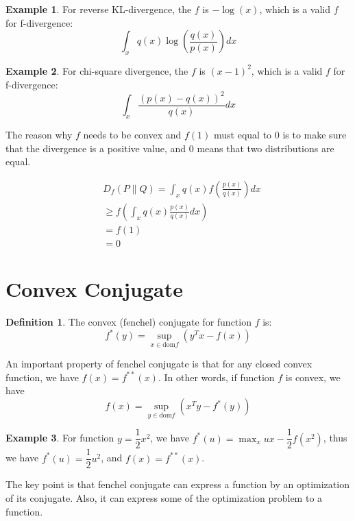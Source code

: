 \documentclass[a4paper]{article}
\theoremstyle{definition}
\newtheorem{defn}{Definition}[section]
\newtheorem{exmp}{Example}[section]
\begin{document}
\begin{exmp}
For reverse KL-divergence, the $f$ is $-\log(x)$, which is a valid $f$ for f-divergence: $$
\int_{x} q(x) \log \left(\frac{q(x)}{p(x)}\right) d x
$$
\end{exmp}

\begin{exmp}
For chi-square divergence, the $f$ is $(x-1)^2$, which is a valid $f$ for f-divergence: $$
\int_{x} \frac{(p(x)-q(x))^{2}}{q(x)} d x
$$
\end{exmp}

The reason why $f$ needs to be convex and $f(1)$ must equal to 0 is to make sure that the divergence is a positive value, and $0$ means that two distributions are equal.

\begin{align}
&D_{f}(P \| Q)=\int_{x} q(x) f\left(\frac{p(x)}{q(x)}\right) d x\\
&\geq f\left(\int_{x} q(x) \frac{p(x)}{q(x)} d x\right)\\
&=f(1)\\
&=0
\end{align}

\section{Convex Conjugate}
\begin{defn}
The convex (fenchel) conjugate for function $f$ is:
\begin{equation}
f^{*}(y)=\sup _{x \in \mathrm{dom} f}\left(y^{T} x-f(x)\right)
\end{equation}
\end{defn}

An important property of fenchel conjugate is that for any closed convex function, we have $f(x) = f^{**}(x)$. In other words, if function $f$ is convex, we have $$f(x) =\sup _{y \in \mathrm{dom} f}\left(x^{T} y-f^{*}(y)\right) $$

\begin{exmp}
For function $y=\dfrac{1}{2}x^2$, we have $f^{*}(u) = \max_{x}ux-\dfrac{1}{2}f(x^2)$, thus we have $f^{*}(u) = \dfrac{1}{2}u^2$, and $f(x) = f^{**}(x)$.
\end{exmp}

The key point is that fenchel conjugate can express a function by an optimization of its conjugate. Also, it can express some of the optimization problem to a function.
\end{document}
